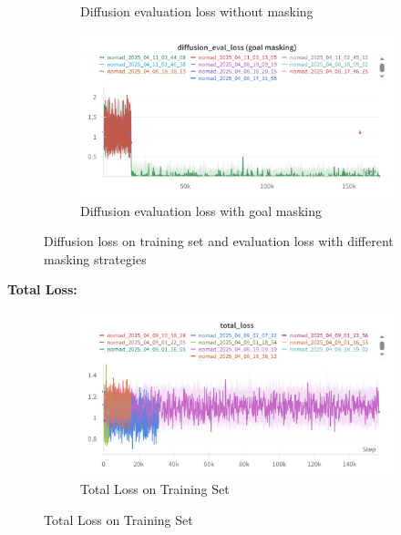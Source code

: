 \documentclass[12pt]{article}
\begin{document}
\begin{figure}[H]
\begin{subfigure}[H]{0.48\textwidth}
        \caption{Diffusion evaluation loss without masking}
        \label{fig:diffusion_eval_loss_no_masking}
    \end{subfigure}
    \hfill
    \begin{subfigure}[H]{0.48\textwidth}
        \centering
        \includegraphics[width=\textwidth]{images/diffusion_eval_loss_goal_masking.png}
        \caption{Diffusion evaluation loss with goal masking}
        \label{fig:diffusion_eval_loss_goal_masking}
    \end{subfigure}
    \caption{Diffusion loss on training set and evaluation loss with different masking strategies}
    \end{figure}
\noindent \textbf{Total Loss:}\\
\begin{figure}[H]
    \centering
    \begin{subfigure}[b]{0.48\textwidth}
        \centering
        \includegraphics[width=\textwidth]{images/total_loss.png}
        \caption{Total Loss on Training Set}
        \label{fig:total_loss}
    \end{subfigure}
    \end{figure}
\end{document}
